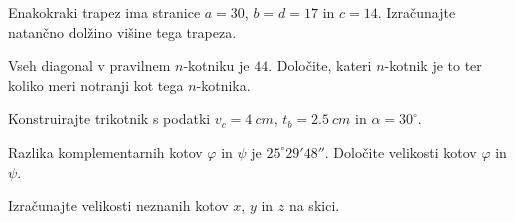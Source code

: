\documentclass[addpoints]{exam}
\begin{document}
\begin{questions}


    \question[4]
    Enakokraki trapez ima stranice $a=30$, $b=d=17$ in $c=14$. Izračunajte natančno dolžino višine tega trapeza.


    \begin{solution}[9cm]
        
    \end{solution}


    \question[4]
    Vseh diagonal v pravilnem $n$-kotniku je $44$. Določite, kateri $n$-kotnik je to ter koliko meri notranji kot tega $n$-kotnika.

    \begin{solution}[5cm]
        
    \end{solution}


    

    \newpage

    \question[6]
    Konstruirajte trikotnik s podatki $v_c=4~cm$, $t_b=2.5~cm$ in $\alpha=30^\circ$.

    \begin{solution}[15cm]
        
    \end{solution}




    \newpage


    \question[5]
    Razlika komplementarnih kotov $\varphi$ in $\psi$ je $25^\circ 29' 48''$.
    Določite velikosti kotov $\varphi$ in $\psi$.

    \begin{solution}[10cm]
        
    \end{solution}


    \question[4]
    Izračunajte velikosti neznanih kotov $x$, $y$ in $z$ na skici.

    \begin{figure}[H]
        \centering
\end{figure}
\end{questions}
\end{document}
